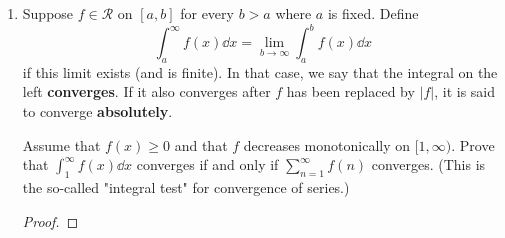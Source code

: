 \documentclass[../psets.tex]{subfiles}
\begin{document}
\begin{enumerate}[label={\textbf{\arabic*.}}]
\begin{enumerate}
\begin{proof}
            Thus,
            \begin{equation*}
                \lim_{c\to 0}\int_c^1f = \sum_{n=2}^\infty\frac{(-1)^n}{n-1}
            \end{equation*}
            which converges by Theorem 3.43. However, the limit fails to exist if $f$ is replaced by $|f|$, because in that case, the integral is equal to the harmonic series, which diverges to infinity.
        \end{proof}
    \end{enumerate}
    \item Suppose $f\in\mathscr{R}$ on $[a,b]$ for every $b>a$ where $a$ is fixed. Define
    \begin{equation*}
        \int_a^\infty f(x)\dd{x} = \lim_{b\to\infty}\int_a^bf(x)\dd{x}
    \end{equation*}
    if this limit exists (and is finite). In that case, we say that the integral on the left \textbf{converges}. If it also converges after $f$ has been replaced by $|f|$, it is said to converge \textbf{absolutely}.\par
    Assume that $f(x)\geq 0$ and that $f$ decreases monotonically on $[1,\infty)$. Prove that $\int_1^\infty f(x)\dd{x}$ converges if and only if $\sum_{n=1}^\infty f(n)$ converges. (This is the so-called "integral test" for convergence of series.)
    \begin{proof}

\end{proof}
\end{enumerate}
\end{document}
